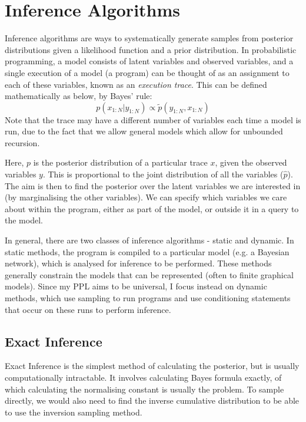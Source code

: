 \section{Inference Algorithms}

Inference algorithms are ways to systematically generate samples from posterior distributions given a likelihood function and a prior distribution. In probabilistic programming, a model consists of latent variables and observed variables, and a single execution of a model (a program) can be thought of as an assignment to each of these variables, known as an \textit{execution trace}. This can be defined mathematically as below, by Bayes' rule:
% 
$$p(x_{1:N}|y_{1:N})\propto \tilde{p}(y_{1:N},x_{1:N})$$ 
% 
Note that the trace may have a different number of variables each time a model is run, due to the fact that we allow general models which allow for unbounded recursion. 

Here, $p$ is the posterior distribution of a particular trace $x$, given the observed variables $y$. This is proportional to the joint distribution of all the variables ($\hat{p}$). The aim is then to find the posterior over the latent variables we are interested in (by marginalising the other variables). We can specify which variables we care about within the program, either as part of the model, or outside it in a query to the model.

In general, there are two classes of inference algorithms - static and dynamic\cite{gordon2014probabilistic}. In static methods, the program is compiled to a particular model (e.g. a Bayesian network), which is analysed for inference to be performed. These methods generally constrain the models that can be represented (often to finite graphical models). Since my PPL aims to be universal, I focus instead on dynamic methods, which use sampling to run programs and use conditioning statements that occur on these runs to perform inference.

\subsection{Exact Inference}

Exact Inference is the simplest method of calculating the posterior, but is usually computationally intractable. It involves calculating Bayes formula exactly, of which calculating the normalising constant is usually the problem. To sample directly, we would also need to find the inverse cumulative distribution to be able to use the inversion sampling method.

